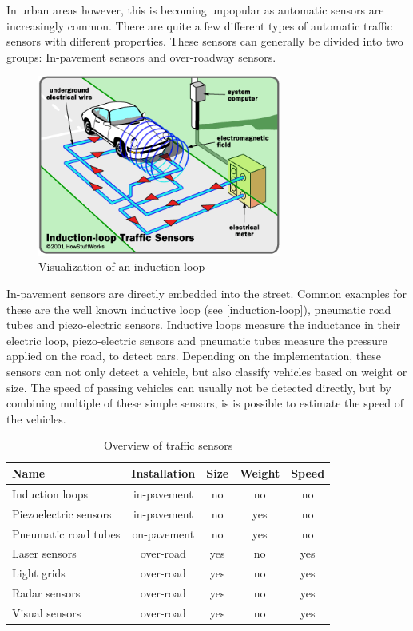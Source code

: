 In urban areas however, this is becoming unpopular as automatic sensors are increasingly common. There are quite a few different types of automatic traffic sensors with different properties. These sensors can generally be divided into two groups: In-pavement sensors and over-roadway sensors.

\begin{figure}[ht]
	\centering
	\includegraphics[width=8cm]{figures/induction-loop}
	\caption{Visualization of an induction loop}
	\label{induction-loop}
\end{figure}

In-pavement sensors are directly embedded into the street. Common examples for these are the well known inductive loop (see \autoref{induction-loop}), pneumatic road tubes and piezo-electric sensors. Inductive loops measure the inductance in their electric loop, piezo-electric sensors and pneumatic tubes measure the pressure applied on the road, to detect cars. Depending on the implementation, these sensors can not only detect a vehicle, but also classify vehicles based on weight or size. The speed of passing vehicles can usually not be detected directly, but by combining multiple of these simple sensors, is is possible to estimate the speed of the vehicles.

\begin{table}[hb!]
	\centering
	\begin{longtabu}{l|c|c|c|c}
		\rowfont{\bfseries}
		Name & Installation & Size & Weight & Speed \\
		\hline
		Induction loops & in-pavement & no & no & no \\
		Piezoelectric sensors & in-pavement & no & yes & no \\
		Pneumatic road tubes & on-pavement & no & yes & no \\
		Laser sensors & over-road & yes & no & yes \\
		Light grids & over-road & yes & no & yes \\
		Radar sensors & over-road & yes & no & yes \\
		Visual sensors & over-road & yes & no & yes \\
	\end{longtabu}
	\caption{Overview of traffic sensors}
	\label{sensor_overview}
\end{table}

